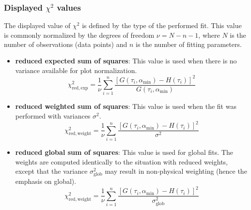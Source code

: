 \subsubsection{Displayed $\chi^2$ values}
The displayed value of $\chi^2$ is defined by the type of the performed fit. This value is commonly normalized by the degrees of freedom $\nu = N - n - 1$, where $N$ is the number of observations (data points) and $n$ is the number of fitting parameters.
\begin{itemize}

\item \textbf{reduced expected sum of squares}: This value is used when there is no variance available for plot normalization.
\begin{equation}
\chi^2_\mathrm{red,exp} = \frac{1}{\nu}\sum_{i=1}^n  \frac{\left[ G(\tau_i,\alpha_\mathrm{min}) - H(\tau_i) \right]^2}{G(\tau_i,\alpha_\mathrm{min})}
\end{equation}

\item \textbf{reduced weighted sum of squares}: This  value is used when the fit was performed with variances $\sigma^2$.
\begin{equation}
\chi^2_\mathrm{red,weight} = \frac{1}{\nu}\sum_{i=1}^n  \frac{\left[ G(\tau_i,\alpha_\mathrm{min}) - H(\tau_i) \right]^2}{\sigma^2}
\end{equation}

\item \textbf{reduced global sum of squares}: This  value is used for global fits. The weights are computed identically to the situation with reduced weights, except that the variance $\sigma_\textrm{glob}^2$ may result in non-physical weighting (hence the emphasis on global).
\begin{equation}
\chi^2_\mathrm{red,weight} = \frac{1}{\nu}\sum_{i=1}^n  \frac{\left[ G(\tau_i,\alpha_\mathrm{min}) - H(\tau_i) \right]^2}{\sigma_\textrm{glob}^2}
\end{equation}

\end{itemize}



